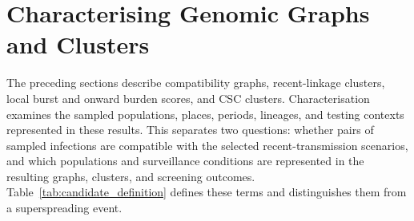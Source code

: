 \section{Characterising Genomic Graphs and Clusters}\label{sec:ch2_characterisation}

The preceding sections describe compatibility graphs, recent-linkage clusters, local burst and onward burden scores, and CSC clusters. Characterisation examines the sampled populations, places, periods, lineages, and testing contexts represented in these results. This separates two questions: whether pairs of sampled infections are compatible with the selected recent-transmission scenarios, and which populations and surveillance conditions are represented in the resulting graphs, clusters, and screening outcomes. Table~\ref{tab:candidate_definition} defines these terms and distinguishes them from a superspreading event.

